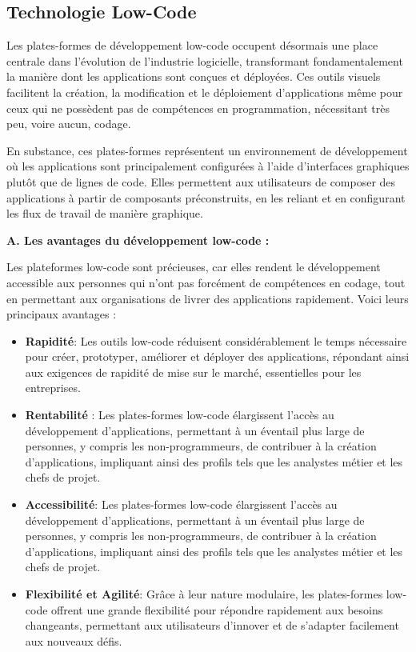     

\subsection{Technologie Low-Code}

\hspace{\parindent}Les plates-formes de développement low-code occupent désormais une place centrale dans l'évolution de l'industrie logicielle, transformant fondamentalement la manière dont les applications sont conçues et déployées. Ces outils visuels facilitent la création, la modification et le déploiement d'applications même pour ceux qui ne possèdent pas de compétences en programmation, nécessitant très peu, voire aucun, codage.

En substance, ces plates-formes représentent un environnement de développement où les applications sont principalement configurées à l'aide d'interfaces graphiques plutôt que de lignes de code. Elles permettent aux utilisateurs de composer des applications à partir de composants préconstruits, en les reliant et en configurant les flux de travail de manière graphique.

\textbf{A. Les avantages du développement low-code :}

Les plateformes low-code sont précieuses, car elles rendent le développement accessible aux personnes qui n'ont pas forcément de compétences en codage, tout en permettant aux organisations de livrer des applications rapidement. Voici leurs principaux avantages :

\begin{itemize}
\item \textbf{Rapidité}: Les outils low-code réduisent considérablement le temps nécessaire pour créer, prototyper, améliorer et déployer des applications, répondant ainsi aux exigences de rapidité de mise sur le marché, essentielles pour les entreprises.

\item \textbf{Rentabilité }: Les plates-formes low-code élargissent l'accès au développement d'applications, permettant à un éventail plus large de personnes, y compris les non-programmeurs, de contribuer à la création d'applications, impliquant ainsi des profils tels que les analystes métier et les chefs de projet.

\item \textbf{Accessibilité}: Les plates-formes low-code élargissent l'accès au développement d'applications, permettant à un éventail plus large de personnes, y compris les non-programmeurs, de contribuer à la création d'applications, impliquant ainsi des profils tels que les analystes métier et les chefs de projet.

\item \textbf{Flexibilité et Agilité}: Grâce à leur nature modulaire, les plates-formes low-code offrent une grande flexibilité pour répondre rapidement aux besoins changeants, permettant aux utilisateurs d'innover et de s'adapter facilement aux nouveaux défis.
\end{itemize}

